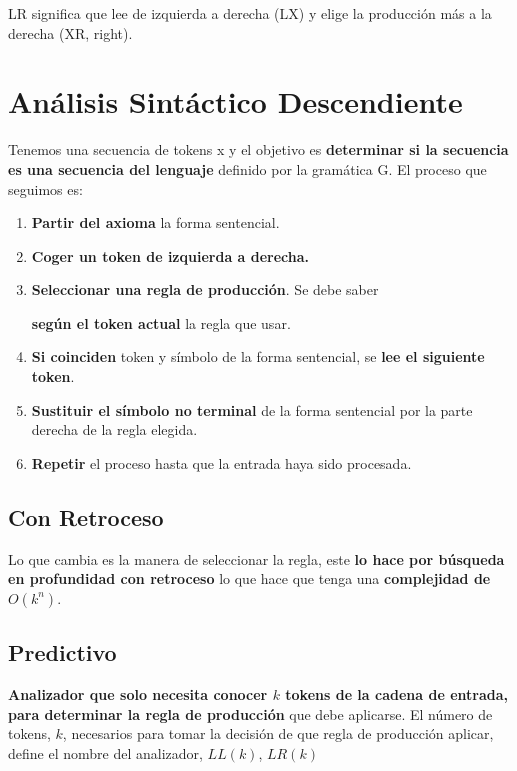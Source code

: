 \documentclass[12pt, twoside, openright]{report} %
\begin{document}
LR significa que lee de izquierda a derecha (LX) y elige la producción
más a la derecha (XR, right).

\section{Análisis Sintáctico Descendiente}

Tenemos una secuencia de tokens x y el objetivo es \textbf{determinar si
	la secuencia es una secuencia del lenguaje} definido por la gramática G.
El proceso que seguimos es:

\begin{enumerate}
	\def\labelenumi{\arabic{enumi}.}
	\item \textbf{Partir del axioma} la forma sentencial.
	\item \textbf{Coger un token de izquierda a derecha.}
	\item \textbf{Seleccionar una regla de producción}. Se debe saber

	      \textbf{según el token actual} la regla que usar.
	\item \textbf{Si coinciden} token y símbolo de la forma sentencial, se
	      \textbf{lee el siguiente token}.
	\item \textbf{Sustituir el símbolo no terminal} de la forma sentencial por
	      la parte derecha de la regla elegida.
	\item \textbf{Repetir} el proceso hasta que la entrada haya sido procesada.
\end{enumerate}


\subsection{Con Retroceso}

Lo que cambia es la manera de seleccionar la regla, este \textbf{lo hace
	por búsqueda en profundidad con retroceso} lo que hace que tenga una
\textbf{complejidad de \(O(k^n)\)}.


\subsection{Predictivo}

\textbf{Analizador que solo necesita conocer \(k\) tokens de la cadena
	de entrada, para determinar la regla de producción} que debe aplicarse.
El número de tokens, \(k\), necesarios para tomar la decisión de que
regla de producción aplicar, define el nombre del analizador, \(LL(k)\),
\(LR(k)\)
\end{document}

